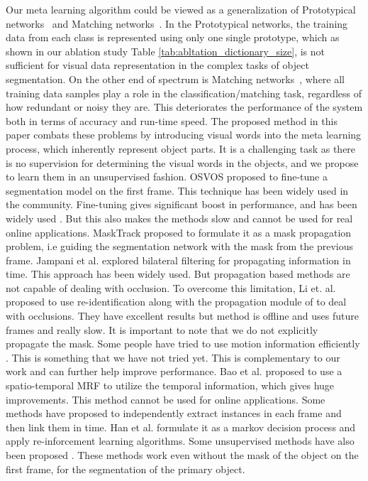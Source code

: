 \documentclass[10pt,twocolumn,letterpaper]{article}
\begin{document}
Our meta learning algorithm could be viewed as a generalization of Prototypical networks~\cite{NIPS2017_6996} and Matching networks~\cite{NIPS2016_6385}. In the Prototypical networks, the training data from each class is represented using only one single prototype, which as shown in our ablation study Table \ref{tab:abltation_dictionary_size}, is not sufficient for visual data representation in the complex tasks of object segmentation. 
On the other end of spectrum is Matching networks~\cite{NIPS2016_6385}, where all training data samples play a role in the classification/matching task, regardless of how redundant or noisy they are. This deteriorates the performance of the system both in terms of accuracy and run-time speed.
The proposed method in this paper combats these problems by introducing visual words into the meta learning process, which inherently represent object parts. It is a challenging task as there is no supervision for determining the visual words in the objects, and we propose to learn them in an unsupervised fashion. 
OSVOS \cite{Caelles_2017_CVPR} proposed to fine-tune a segmentation model on the first frame. This technique has been widely used in the community. Fine-tuning gives significant boost in performance, and has been widely used \cite{onavos,hu2017maskrnn, Cheng_2017_ICCV, masktrack, Jampani_2017_CVPR,lucid, Yoon_2017_ICCV, Ci_2018_ECCV}. But this also makes the methods slow and cannot be used for real online applications.
MaskTrack \cite{masktrack} proposed to formulate it as a mask propagation problem, i.e guiding the segmentation network with the mask from the previous frame.
Jampani et al. \cite{Jampani_2017_CVPR} explored bilateral filtering for propagating information in time.
This approach has been widely used. But propagation based methods are not capable of dealing with occlusion. To overcome this limitation, Li et. al. \cite{Li_2018_ECCV} proposed to use re-identification along with the propagation module of \cite{masktrack} to deal with occlusions. They have excellent results but method is offline and uses future frames and really slow.
It is important to note that we do not explicitly propagate the mask.
Some people have tried to use motion information efficiently \cite{Hu_2018_CVPR, Xiao_2018_CVPR, Cheng_2017_ICCV, Jain_2017_CVPR, Tsai_2016_CVPR}. This is something that we have not tried yet. This is complementary to our work and can further help improve performance.
Bao et al.\cite{Bao_2018_CVPR} proposed to use a spatio-temporal MRF to utilize the temporal information, which gives huge improvements. This method cannot be used for online applications.
Some methods\cite{Koh_2018_ECCV, Yeo_2017_CVPR, Yang_2017_CVPR} have proposed to independently extract instances in each frame and then link them in time.
Han et al. \cite{Han_2018_CVPR} formulate it as a markov decision process and apply re-inforcement learning algorithms.
Some unsupervised methods have also been proposed \cite{Li_2018_ECCV_un, Hu_2018_ECCV_un, Li_2018_CVPR, Tokmakov_2017_ICCV, Koh_2017_CVPR, Jain_2017_CVPR}. These methods work even without the mask of the object on the first frame, for the segmentation of the primary object.
\end{document}
